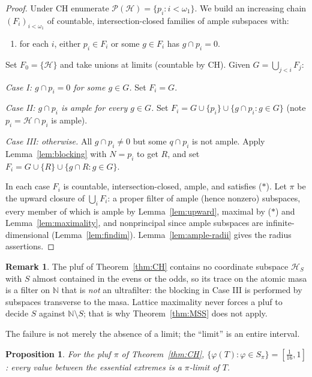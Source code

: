 \documentclass[11pt,reqno]{amsart}
\newtheorem{proposition}[theorem]{Proposition}
\theoremstyle{definition}
\newtheorem{remark}[theorem]{Remark}
\newcommand{\HH}{\mathcal{H}}
\newcommand{\PP}{\mathcal{P}}
\newcommand{\N}{\mathbb{N}}
\newcommand{\pluf}{\pi}
\begin{document}
\begin{proof}
Under CH enumerate $\PP(\HH)=\{p_i:i<\omega_1\}$. We build an increasing chain
$(F_i)_{i<\omega_1}$ of countable, intersection-closed families of ample subspaces with:
\begin{enumerate}
\item[($\ast$)] for each $i$, either $p_i\in F_i$ or some $g\in F_i$ has $g\cap p_i=0$.
\end{enumerate}
Set $F_0=\{\HH\}$ and take unions at limits (countable by CH). Given
$G=\bigcup_{j<i}F_j$:

\emph{Case I: $g\cap p_i=0$ for some $g\in G$.} Set $F_i=G$.

\emph{Case II: $g\cap p_i$ is ample for every $g\in G$.} Set
$F_i=G\cup\{p_i\}\cup\{g\cap p_i:g\in G\}$ (note $p_i=\HH\cap p_i$ is ample).

\emph{Case III: otherwise.} All $g\cap p_i\neq0$ but some $q\cap p_i$ is not ample.
Apply Lemma~\ref{lem:blocking} with $N=p_i$ to get $R$, and set
$F_i=G\cup\{R\}\cup\{g\cap R:g\in G\}$.

In each case $F_i$ is countable, intersection-closed, ample, and satisfies ($\ast$).
Let $\pluf$ be the upward closure of $\bigcup_iF_i$: a proper filter of ample (hence
nonzero) subspaces, every member of which is ample by Lemma~\ref{lem:upward}, maximal by
($\ast$) and Lemma~\ref{lem:maximality}, and nonprincipal since ample subspaces are
infinite-dimensional (Lemma~\ref{lem:findim}). Lemma~\ref{lem:ample-radii} gives the
radius assertions.
\end{proof}

\begin{remark}
The pluf of Theorem~\ref{thm:CH} contains no coordinate subspace $\HH_S$ with $S$ almost
contained in the evens or the odds, so its trace on the atomic masa is a filter on $\N$
that is \emph{not} an ultrafilter: the blocking in Case III is performed by subspaces
transverse to the masa. Lattice maximality never forces a pluf to decide $S$ against
$\N\setminus S$; that is why Theorem~\ref{thm:MSS} does not apply.
\end{remark}

The failure is not merely the absence of a limit; the ``limit'' is an entire interval.

\begin{proposition}\label{prop:interval}
For the pluf $\pluf$ of Theorem~\ref{thm:CH},
$\{\varphi(T):\varphi\in S_\pluf\}=[\tfrac1{16},1]$: every value between the essential
extremes is a $\pluf$-limit of $T$.
\end{proposition}
\end{document}
